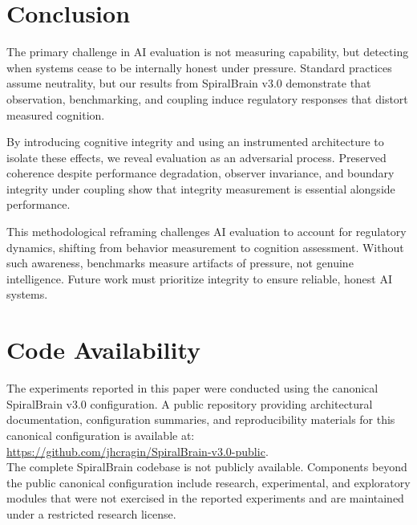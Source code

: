 \documentclass[12pt,a4paper]{report}
\begin{document}
\section{Conclusion}

The primary challenge in AI evaluation is not measuring capability, but detecting when systems cease to be internally honest under pressure. Standard practices assume neutrality, but our results from SpiralBrain v3.0 demonstrate that observation, benchmarking, and coupling induce regulatory responses that distort measured cognition.

By introducing cognitive integrity and using an instrumented architecture to isolate these effects, we reveal evaluation as an adversarial process. Preserved coherence despite performance degradation, observer invariance, and boundary integrity under coupling show that integrity measurement is essential alongside performance.

This methodological reframing challenges AI evaluation to account for regulatory dynamics, shifting from behavior measurement to cognition assessment. Without such awareness, benchmarks measure artifacts of pressure, not genuine intelligence. Future work must prioritize integrity to ensure reliable, honest AI systems.

\section{Code Availability}

The experiments reported in this paper were conducted using the canonical SpiralBrain v3.0 configuration.
A public repository providing architectural documentation, configuration summaries, and reproducibility materials for this canonical configuration is available at: \\
\url{https://github.com/jhcragin/SpiralBrain-v3.0-public}. \\

The complete SpiralBrain codebase is not publicly available. Components beyond the public canonical configuration include research, experimental, and exploratory modules that were not exercised in the reported experiments and are maintained under a restricted research license.



\end{document}
